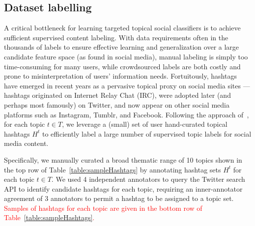 %

%
%


\subsection*{Dataset labelling}

A critical bottleneck for learning targeted topical social classifiers 
is to achieve sufficient supervised content labeling.  With data
requirements often in the thousands of labels to ensure effective
learning and generalization over a large candidate feature space (as
found in social media), manual labeling is simply too time-consuming
for many users, while crowdsourced labels are both costly and prone to
misinterpretation of users' information needs.  Fortuitously, hashtags
have emerged in recent years as a pervasive topical proxy on social
media sites --- hashtags originated on Internet Relay Chat (IRC), were adopted later
(and perhaps most famously) on Twitter, and now appear on other social
media platforms such as Instagram, Tumblr, and Facebook.  Following
the approach of~\cite{lin2011smoothing}, for each topic $t \in T$, we leverage a (small) set of
user hand-curated topical hashtags $H^t$ to efficiently label a large number of
supervised topic labels for social media content.  

Specifically, we manually curated a broad thematic range of 10 topics shown in the top row of
Table~\ref{table:sampleHashtags} by annotating hashtag sets $H^t$ for each topic $t \in T$.  
We used 4 independent annotators to query the Twitter search API to identify candidate hashtags for each topic, requiring an inner-annotator agreement of 3 annotators to permit a hashtag to be assigned to a topic set. 
\textcolor{red}{Samples of hashtags for each topic are given in the bottom row of Table~\ref{table:sampleHashtags}.}



